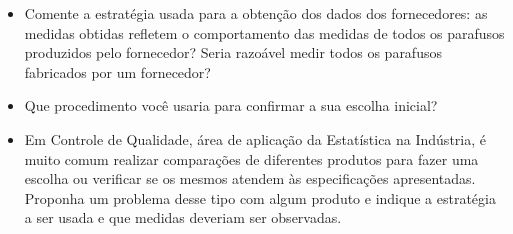 \clearpage
\begin{reflection}

\begin{itemize}
\item Comente a estratégia usada para a obtenção dos dados dos fornecedores: as medidas obtidas refletem o comportamento das medidas de todos os parafusos produzidos pelo fornecedor? Seria razoável medir todos os parafusos fabricados por um fornecedor?

\item Que procedimento você usaria para confirmar a sua escolha inicial?

\item Em Controle de Qualidade, área de aplicação da Estatística na Indústria, é muito comum realizar comparações de diferentes produtos para fazer uma escolha ou verificar se os mesmos atendem às especificações apresentadas. Proponha um problema desse tipo com algum produto e indique a estratégia a ser usada e que medidas deveriam ser observadas.

\end{itemize}
\end{reflection}

